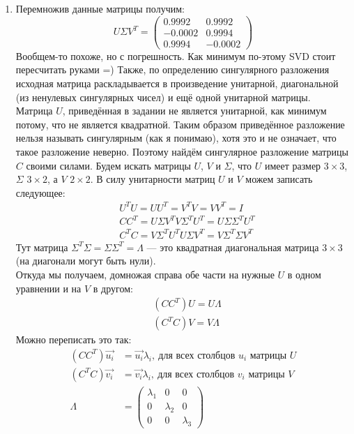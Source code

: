 \begin{solution}
\begin{enumerate}
	\item Перемножив данные матрицы получим:
	\begin{equation*}
	U\Sigma V^T = 
	\begin{pmatrix}
		0.9992 & 0.9992 \\
		-0.0002 & 0.9994 \\ 
        0.9994 & -0.0002
	\end{pmatrix}
	\end{equation*}
	Вообщем-то похоже, но с погрешность. Как минимум по-этому SVD стоит пересчитать руками =) Также, по определению сингулярного разложения исходная матрица раскладывается в произведение унитарной, диагональной (из ненулевых сингулярных чисел) и ещё одной унитарной матрицы. Матрица $U$, приведённая в задании не является унитарной, как минимум потому, что не является квадратной. Таким образом приведённое разложение нельзя называть сингулярным (как я понимаю), хотя это и не означает, что такое разложение неверно. Поэтому найдём сингулярное разложение матрицы $C$ своими силами.
	Будем искать матрицы $U$, $V$ и $\Sigma$, что $U$ имеет размер $3\times3$, $\Sigma$ $3\times2$, а $V$ $2 \times 2$. В силу унитарности матриц $U$ и $V$ можем записать следующее:
	\begin{align*}
		& U^T U = UU^T = V^TV = VV^T = I \\
		& CC^T = U\Sigma V^T V\Sigma^TU^T = U\Sigma\Sigma^TU^T \\
		& C^TC = V\Sigma^TU^TU\Sigma V^T = V\Sigma^T\Sigma V^T 
	\end{align*}
	Тут матрица $\Sigma^T \Sigma = \Sigma\Sigma^T = \Lambda$ --- это квадратная диагональная матрица $3\times3$ (на диагонали могут быть нули).\\
	Откуда мы получаем, домножая справа обе части на нужные $U$ в одном уравнении и на $V$ в другом:
	\begin{align*}
		& (CC^T)U = U\Lambda \\
		& (C^TC)V = V\Lambda
	\end{align*}
	Можно переписать это так:
	\begin{align*}
		(CC^T)\vec{u_i} &= \vec{u_i}\lambda_i,\ \text{для всех столбцов $u_i$ матрицы $U$} \\
		(C^TC)\vec{v_i} &= \vec{v_i}\lambda_i,\ \text{для всех столбцов $v_i$ матрицы $V$} \\
		\Lambda &= 
		\begin{pmatrix}
			\lambda_1 & 0 & 0 \\
			0 & \lambda_2 & 0 \\
			0 & 0 & \lambda_3

\end{pmatrix}
\end{align*}
\end{enumerate}
\end{solution}
